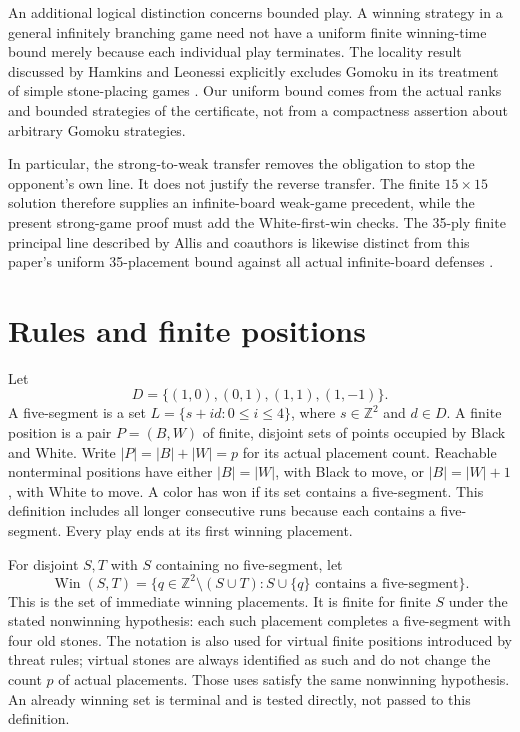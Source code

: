 \documentclass[11pt]{article}
\theoremstyle{definition}
\theoremstyle{remark}
\newcommand{\Z}{\mathbb Z}
\newcommand{\Win}{\operatorname{Win}}
\begin{document}
An additional logical distinction concerns bounded play. A winning strategy
in a general infinitely branching game need not have a uniform finite
winning-time bound merely because each individual play terminates. The
locality result discussed by Hamkins and Leonessi explicitly excludes Gomoku
in its treatment of simple stone-placing games \cite{Hamkins2023}. Our
uniform bound comes from the actual ranks and bounded strategies of the
certificate, not from a compactness assertion about arbitrary Gomoku
strategies.

In particular, the strong-to-weak transfer removes the obligation to stop
the opponent's own line. It does not justify the reverse transfer. The
finite $15\times15$ solution therefore supplies an infinite-board weak-game
precedent, while the present strong-game proof must add the White-first-win
checks. The 35-ply finite principal line described by Allis and coauthors
is likewise distinct from this paper's uniform 35-placement bound against
all actual infinite-board defenses \cite{Allis1993,Hefetz2014}.

\section{Rules and finite positions}
\label{sec:rules}
Let
\[
 D=\{(1,0),(0,1),(1,1),(1,-1)\}.
\]
A five-segment is a set $L=\{s+id:0\leq i\leq4\}$, where $s\in\Z^2$
and $d\in D$. A finite position is a pair $P=(B,W)$ of finite, disjoint
sets of points occupied by Black and White. Write $|P|=|B|+|W|=p$ for
its actual placement count. Reachable nonterminal positions have either
$|B|=|W|$, with Black to move, or $|B|=|W|+1$, with White to move.
A color has won if its set contains a five-segment. This definition includes
all longer consecutive runs because each contains a five-segment.
Every play ends at its first winning placement.

For disjoint $S,T$ with $S$ containing no five-segment, let
\[
 \Win(S,T)=\{q\in\Z^2\setminus(S\cup T):
              S\cup\{q\}\text{ contains a five-segment}\}.
\]
This is the set of immediate winning placements. It is finite for finite
$S$ under the stated nonwinning hypothesis: each such placement completes
a five-segment with four old stones. The notation is also used for virtual
finite positions introduced by threat rules; virtual stones are always
identified as such and do not change the count $p$ of actual placements.
Those uses satisfy the same nonwinning hypothesis. An already winning set
is terminal and is tested directly, not passed to this definition.
\end{document}

